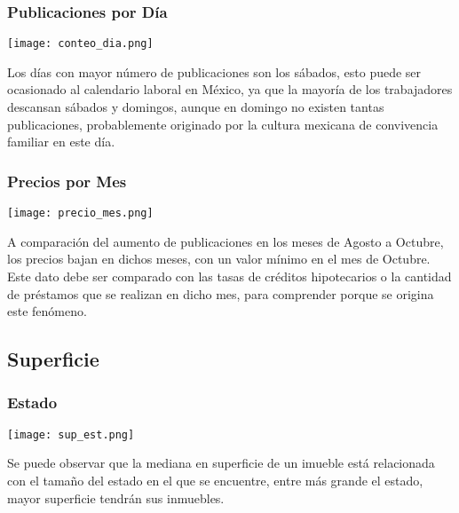 \documentclass{report}
\begin{document}
\subsubsection{Publicaciones por Día}
\begin{center}
\texttt{[image: conteo\_dia.png]}
\end{center}
Los días con mayor número de publicaciones son los sábados, esto puede ser ocasionado al calendario laboral en México, ya que la mayoría de los trabajadores descansan sábados y domingos, aunque en domingo no existen tantas publicaciones, probablemente originado por la cultura mexicana de convivencia familiar en este día.

\subsubsection{Precios por Mes}
\begin{center}
\texttt{[image: precio\_mes.png]}
\end{center}
A comparación del aumento de publicaciones en los meses de Agosto a Octubre, los precios bajan en dichos meses, con un valor mínimo en el mes de Octubre. Este dato debe ser comparado con las tasas de créditos hipotecarios o la cantidad de préstamos que se realizan en dicho mes, para comprender porque se origina este fenómeno.

\subsection{Superficie}
\subsubsection{Estado}
\begin{center}
\texttt{[image: sup\_est.png]}
\end{center}
Se puede observar que la mediana en superficie de un imueble está relacionada con el tamaño del estado en el que se encuentre, entre más grande el estado, mayor superficie tendrán sus inmuebles.
\end{document}
